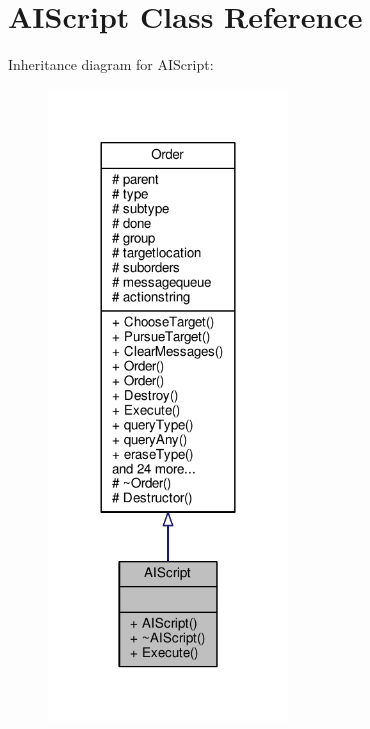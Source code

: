 \hypertarget{classAIScript}{}\section{A\+I\+Script Class Reference}
\label{classAIScript}


Inheritance diagram for A\+I\+Script\+:
\nopagebreak
\begin{figure}[H]
\begin{center}
\leavevmode
\includegraphics[width=180pt]{d6/db2/classAIScript__inherit__graph}
\end{center}
\end{figure}


